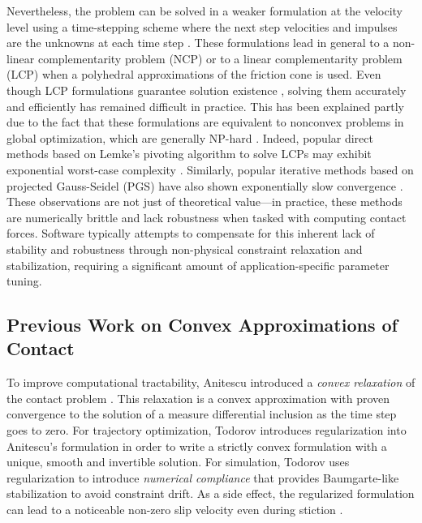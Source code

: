 Nevertheless, the problem can be solved in a weaker formulation at the velocity
level using a time-stepping scheme where the next step velocities and impulses
are the unknowns at each time step \cite{bib:stewart1996implicit,
bib:anitescu1997}. These formulations lead in general to a non-linear
complementarity problem (NCP) or to a linear complementarity problem (LCP) when
a polyhedral approximations of the friction cone is used. Even though LCP
formulations guarantee solution existence \cite{bib:anitescu1997,
bib:stewart1998convergence}, solving them accurately and efficiently has
remained difficult in practice. This has been explained partly due to the fact
that these formulations are equivalent to nonconvex problems in global
optimization, which are generally NP-hard \cite{bib:Kaufman2008}. Indeed,
popular direct methods based on Lemke's pivoting algorithm to solve LCPs may
exhibit exponential worst-case complexity \cite{bib:baraff1994fast}. Similarly,
popular iterative methods based on projected Gauss-Seidel (PGS)
\cite{bib:duriez2006_realistic_haptic_rendering, bib:bullet} have also shown
exponentially slow convergence \cite{bib:erleben2007velocity}. These
observations are not just of theoretical value---in practice, these methods are
numerically brittle and lack robustness when tasked with computing contact
forces. Software typically attempts to compensate for this inherent lack of
stability and robustness through non-physical constraint relaxation and
stabilization, requiring a significant amount of application-specific parameter
tuning.

\subsection{Previous Work on Convex Approximations of Contact}
To improve computational tractability, Anitescu introduced a \textit{convex
relaxation} of the contact problem \cite{bib:anitescu2006}. This relaxation is a
convex approximation with proven convergence to the solution of a measure
differential inclusion as the time step goes to zero. 
 For
trajectory optimization, Todorov \cite{bib:todorov2011} introduces
regularization into Anitescu's formulation in order to write a strictly convex
formulation with a unique, smooth and invertible solution. For simulation,
Todorov \cite{bib:todorov2014} uses regularization to introduce \emph{numerical
compliance} that provides Baumgarte-like stabilization to avoid constraint
drift. As a side effect, the regularized formulation can lead to a noticeable
non-zero slip velocity even during stiction \cite{bib:simbenchmark}.

